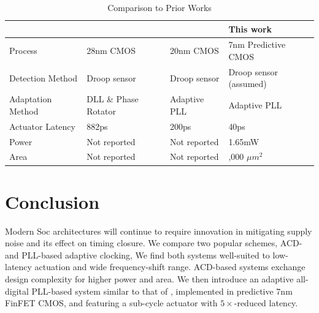 \documentclass[twoside,9pt,journal,letterpage]{IEEEtran}
\begin{document}
\begin{table}[!ht]
\caption{Comparison to Prior Works} 
\label{table:comparison}
\centering
\begin{tabularx}{\columnwidth}{
	| >{\centering\arraybackslash}X 
	| >{\centering\arraybackslash}X 
	| >{\centering\arraybackslash}X 
	| >{\centering\arraybackslash}X | }
	\hline
	& \cite{wilcox2015} & \cite{hashimoto2018} & This work \\
	\hline
	Process & 28nm CMOS & 20nm CMOS & 7nm Predictive CMOS  \\
	\hline
	Detection Method & Droop sensor & Droop sensor & Droop sensor (assumed)  \\
	\hline
	Adaptation Method & DLL \& Phase Rotator & Adaptive PLL & Adaptive PLL  \\
	\hline
	Actuator Latency & 882ps & 200ps & 40ps  \\
	\hline
	Power & Not reported & Not reported & 1.65mW \\
	\hline
	Area & Not reported & Not reported & 10,000 $\mu m^2$ \\
	\hline
\end{tabularx}
\end{table}


\vspace{-5pt}
\section{Conclusion}
\label{sec:conclusion}

Modern Soc architectures will continue to require innovation in mitigating supply noise and its effect on timing closure. We compare two popular schemes, ACD- and PLL-based adaptive clocking, We find both systems well-suited to low-latency actuation and wide frequency-shift range. ACD-based systems exchange design complexity for higher power and area. We then introduce an adaptive all-digital PLL-based system similar to that of \cite{hashimoto2018}, implemented in predictive 7nm FinFET CMOS, and featuring a sub-cycle actuator with $5\times$-reduced latency. 

\vspace{-5pt}

\begingroup
\raggedright

\endgroup
\end{document}
